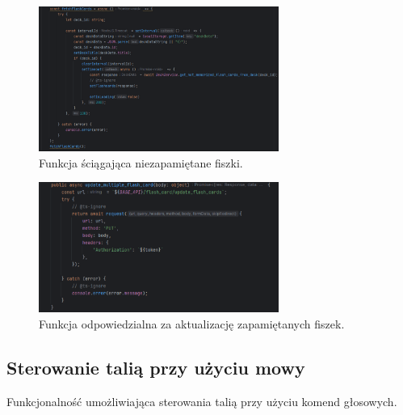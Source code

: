 \begin{figure}[H]
    \centering
    \includegraphics[width=0.7\textwidth]{chapters/chapter_8/screens/get_unmemorized_flash_cards_web}
    \caption{Funkcja ściągająca niezapamiętane fiszki.}
    \label{img:get_unmemorized_flash_cards_web}
\end{figure}

\begin{figure}[H]
    \centering
    \includegraphics[width=0.7\textwidth]{chapters/chapter_8/screens/update_unmemorized_flash_cards_web}
    \caption{Funkcja odpowiedzialna za aktualizację zapamiętanych fiszek.}
    \label{img:update_unmemorized_flash_cards_web}
\end{figure}

\subsection{Sterowanie talią przy użyciu mowy}
Funkcjonalność umożliwiająca sterowania talią przy użyciu komend głosowych.


